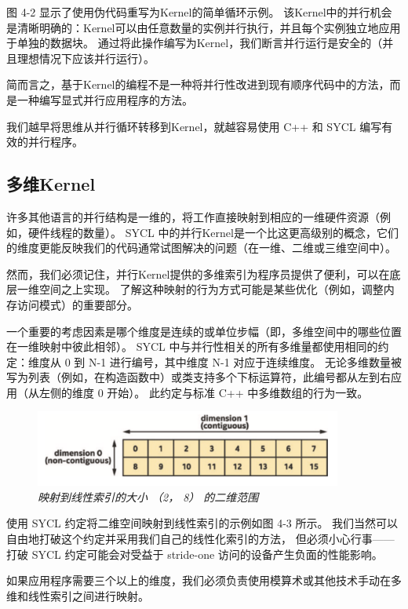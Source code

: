 图 4-2 显示了使用伪代码重写为Kernel的简单循环示例。 
该Kernel中的并行机会是清晰明确的：Kernel可以由任意数量的实例并行执行，并且每个实例独立地应用于单独的数据块。 
通过将此操作编写为Kernel，我们断言并行运行是安全的（并且理想情况下应该并行运行）。

简而言之，基于Kernel的编程不是一种将并行性改进到现有顺序代码中的方法，而是一种编写显式并行应用程序的方法。

\begin{remark}
	我们越早将思维从并行循环转移到Kernel，就越容易使用 C++ 和 SYCL 编写有效的并行程序。
\end{remark}

\subsection{多维Kernel}
许多其他语言的并行结构是一维的，将工作直接映射到相应的一维硬件资源（例如，硬件线程的数量）。 
SYCL 中的并行Kernel是一个比这更高级别的概念，它们的维度更能反映我们的代码通常试图解决的问题（在一维、二维或三维空间中）。

然而，我们必须记住，并行Kernel提供的多维索引为程序员提供了便利，可以在底层一维空间之上实现。 
了解这种映射的行为方式可能是某些优化（例如，调整内存访问模式）的重要部分。

一个重要的考虑因素是哪个维度是连续的或单位步幅（即，多维空间中的哪些位置在一维映射中彼此相邻）。 
SYCL 中与并行性相关的所有多维量都使用相同的约定：维度从 0 到 N-1 进行编号，其中维度 N-1 对应于连续维度。 
无论多维数量被写为列表（例如，在构造函数中）或类支持多个下标运算符，此编号都从左到右应用（从左侧的维度 0 开始）。 
此约定与标准 C++ 中多维数组的行为一致。

\begin{figure}[H]
	\centering
	\includegraphics[width=0.9\textwidth]{figs/F4.3.png}
	\caption{\textit{映射到线性索引的大小 （2， 8） 的二维范围}}
\end{figure}

使用 SYCL 约定将二维空间映射到线性索引的示例如图 4-3 所示。 
我们当然可以自由地打破这个约定并采用我们自己的线性化索引的方法，
但必须小心行事——打破 SYCL 约定可能会对受益于 stride-one 访问的设备产生负面的性能影响。

如果应用程序需要三个以上的维度，我们必须负责使用模算术或其他技术手动在多维和线性索引之间进行映射。

